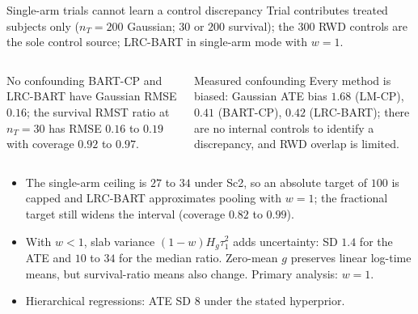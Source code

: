 \documentclass[11pt,aspectratio=169]{beamer}
\begin{document}
\begin{frame}[t]{Single-arm trials cannot learn a control discrepancy}
  \footnotesize
  Trial contributes treated subjects only ($n_T=200$ Gaussian; $30$ or $200$ survival); the $300$ RWD controls are the sole control source; LRC-BART in single-arm mode with $w=1$.
  \begin{columns}[T,onlytextwidth]
      \begin{block}{No confounding}
        BART-CP and LRC-BART have Gaussian RMSE $0.16$; the survival RMST ratio at $n_T=30$ has RMSE $0.16$ to $0.19$ with coverage $0.92$ to $0.97$.
      \end{block}
      \begin{alertblock}{Measured confounding}
        Every method is biased: Gaussian ATE bias $1.68$ (LM-CP), $0.41$ (BART-CP), $0.42$ (LRC-BART); there are no internal controls to identify a discrepancy, and RWD overlap is limited.
      \end{alertblock}
  \end{columns}
  \vspace{0.3em}
  \begin{itemize}
    \item The single-arm ceiling is $27$ to $34$ under Sc2, so an absolute target of $100$ is capped and LRC-BART approximates pooling with $w=1$; the fractional target still widens the interval (coverage $0.82$ to $0.99$).
    \item With $w<1$, slab variance $(1-w)H_g\tau_1^2$ adds uncertainty: SD $1.4$ for the ATE and $10$ to $34$ for the median ratio. Zero-mean $g$ preserves linear log-time means, but survival-ratio means also change. Primary analysis: $w=1$.
    \item Hierarchical regressions: ATE SD $8$ under the stated hyperprior.
  \end{itemize}
\end{frame}
\end{document}
